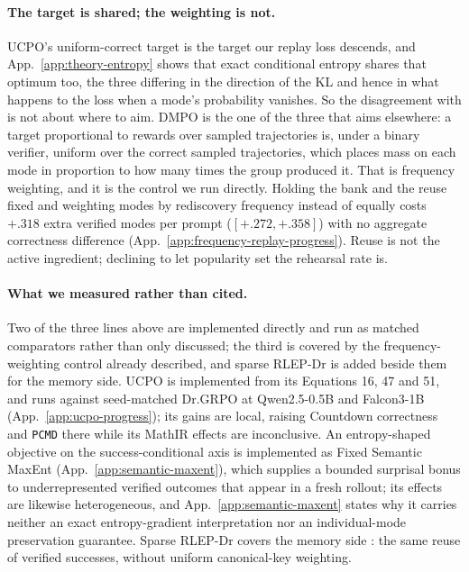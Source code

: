 \documentclass{article}
\newcommand{\1}{\mathbf 1}
\newcommand{\pmd}{\texttt{PCMD}}
\theoremstyle{remark}
\theoremstyle{definition}
\theoremstyle{plain}
\begin{document}
\paragraph{The target is shared; the weighting is not.}
UCPO's uniform-correct target is the target our replay loss descends, and
App.~\ref{app:theory-entropy} shows that exact conditional entropy shares that
optimum too, the three differing in the direction of the KL and hence in what
happens to the loss when a mode's probability vanishes. So the disagreement
with \citet{lochab2026ucpo} is not about where to aim. DMPO is the one of the
three that aims elsewhere: a target proportional to rewards over sampled
trajectories is, under a binary verifier, uniform over the correct sampled
trajectories, which places mass on each mode in proportion to how many times
the group produced it. That is frequency weighting, and it is the control we
run directly. Holding the bank and the reuse fixed and weighting modes by
rediscovery frequency instead of equally costs $+.318$ extra verified modes per
prompt ($[+.272,+.358]$) with no aggregate correctness difference
(App.~\ref{app:frequency-replay-progress}). Reuse is not the active
ingredient; declining to let popularity set the rehearsal rate is.

\paragraph{What we measured rather than cited.}
Two of the three lines above are implemented directly and run as matched
comparators rather than only discussed; the third is covered by the
frequency-weighting control already described, and sparse RLEP-Dr is added
beside them for the memory side. UCPO is implemented from its Equations 16, 47
and 51, and runs
against seed-matched Dr.GRPO at Qwen2.5-0.5B and Falcon3-1B
(App.~\ref{app:ucpo-progress}); its gains are local, raising Countdown
correctness and \pmd{} there while its MathIR effects are inconclusive. An
entropy-shaped objective on the success-conditional axis is implemented as
Fixed Semantic MaxEnt (App.~\ref{app:semantic-maxent}), which supplies a
bounded surprisal bonus to underrepresented verified outcomes that appear in a
fresh rollout; its effects are likewise heterogeneous, and App.~\ref{app:semantic-maxent}
states why it carries neither an exact entropy-gradient interpretation nor an
individual-mode preservation guarantee. Sparse RLEP-Dr covers the memory side
\citep{zhang2025rlep}: the same reuse of verified successes, without uniform
canonical-key weighting.
\end{document}
